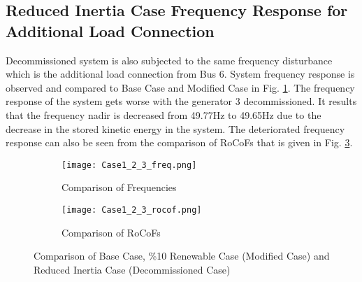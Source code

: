 \subsection{Reduced Inertia Case Frequency Response for Additional Load Connection}
Decommissioned system is also subjected to the same frequency disturbance which is the additional load connection from Bus 6. System frequency response is observed and compared to Base Case and Modified Case in Fig. \ref{Case1_2_3_freq}. The frequency response of the system gets worse with the generator 3 decommissioned. It results that the frequency nadir is decreased from 49.77Hz to 49.65Hz due to the decrease in the stored kinetic energy in the system. The deteriorated frequency response can also be seen from the comparison of RoCoFs that is given in Fig. \ref{Case1_2_3_rocof}. 
\begin{figure}[h!]
	\centering
	\begin{subfigure}{0.8\textwidth} %
	\centering	\texttt{[image: Case1\_2\_3\_freq.png]}
		\caption{Comparison of Frequencies}		
		\label{Case1_2_3_freq}
	\end{subfigure}
	\vspace{0.1em} %
	\begin{subfigure}{0.8\textwidth}
	\centering	\texttt{[image: Case1\_2\_3\_rocof.png]}
		\caption{Comparison of RoCoFs}
		\label{Case1_2_3_rocof}	
	\end{subfigure}
	\caption{Comparison of Base Case, \%10 Renewable Case (Modified Case) and Reduced Inertia Case (Decommissioned Case)}
\end{figure}
